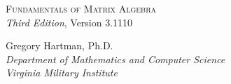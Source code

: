 \begin{flushright}

\textsc{\huge Fundamentals of Matrix Algebra} \\

\textsl{Third Edition}, 
{\small Version 3.1110}\\

\Large
\vspace{1in}

Gregory Hartman, Ph.D.\\

\emph{\small Department of Mathematics and Computer Science}\\

\emph{\small Virginia Military Institute}

\normalsize
\end{flushright}

